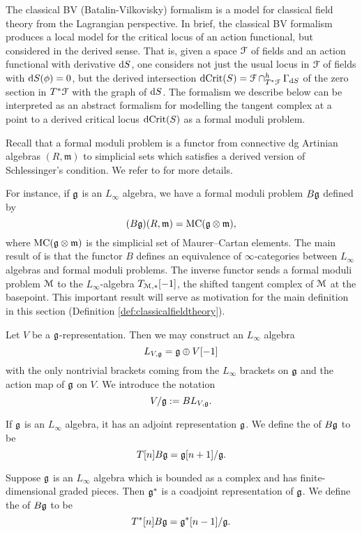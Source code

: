 \documentclass[10pt, oneside]{article}
\begin{document}
The classical BV (Batalin-Vilkovisky) formalism \cite{BatalinVilkovisky} is a model for classical field theory from the Lagrangian perspective.  In brief, the classical BV formalism produces a local model for the critical locus of an action functional, but considered in the derived sense.  That is, given a space $\mathcal{F}$ of fields and an action functional with derivative ${\rm d} S$, one considers not just the usual locus in $\mathcal{F}$ of fields with ${\rm d} S(\phi) = 0$, but the derived intersection $\mathrm{dCrit}(S) = \mathcal{F} \cap^h_{T^*\mathcal{F}} \Gamma_{{\rm d} S}$ of the zero section in $T^*\mathcal{F}$ with the graph of ${\rm d} S$.  The formalism we describe below can be interpreted as an abstract formalism for modelling the tangent complex at a point to a derived critical locus $\mathrm{dCrit}(S)$ as a formal moduli problem.

Recall that a formal moduli problem is a functor from connective dg Artinian algebras $(R, \mathfrak{m})$ to simplicial sets which satisfies a derived version of Schlessinger's condition. We refer to \cite{DAGX,PridhamFMP,Toen} for more details.

For instance, if $\mathfrak g$ is an $L_\infty$ algebra, we have a formal moduli problem $B\mathfrak g$ defined by
\[(B\mathfrak g)(R, \mathfrak{m})=\mathrm{MC}(\mathfrak g\otimes \mathfrak{m}),\]
where $\mathrm{MC}(\mathfrak g\otimes \mathfrak{m})$ is the simplicial set of Maurer--Cartan elements. The main result of \cite{DAGX,PridhamFMP} is that the functor $B$ defines an equivalence of $\infty$-categories between $L_\infty$ algebras and formal moduli problems. The inverse functor sends a formal moduli problem $\mathcal M$ to the $L_\infty$-algebra $T_{\mathcal M, \ast}[-1]$, the shifted tangent complex of $\mathcal M$ at the basepoint. This important result will serve as motivation for the main definition in this section (Definition \ref{def:classicalfieldtheory}).

Let $V$ be a $\mathfrak g$-representation. Then we may construct an $L_\infty$ algebra
\[L_{V, \mathfrak g}=\mathfrak g\oplus V[-1]\]
with the only nontrivial brackets coming from the $L_\infty$ brackets on $\mathfrak g$ and the action map of $\mathfrak g$ on $V$. We introduce the notation
\[V/\mathfrak g:= B L_{V, \mathfrak g}.\]

\begin{example}
If $\mathfrak g$ is an $L_\infty$ algebra, it has an adjoint representation $\mathfrak g$. We define the  of $B\mathfrak g$ to be
\[T[n] B\mathfrak g = \mathfrak g[n+1] / \mathfrak g.\]
\label{ex:tangentBg}
\end{example}

\begin{example}
Suppose $\mathfrak g$ is an $L_\infty$ algebra which is bounded as a complex and has finite-dimensional graded pieces. Then $\mathfrak g^*$ is a coadjoint representation of $\mathfrak g$. We define the  of $B\mathfrak g$ to be
\[T^*[n] B\mathfrak g = \mathfrak g^*[n-1] / \mathfrak g.\]
\label{ex:cotangentBg}
\end{example}
\end{document}

